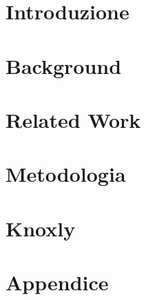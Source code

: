\documentclass[14pt]{extreport}
\begin{document}




\chapter{Introduzione}
\setcounter{page}{1} 		


\chapter{Background}


\chapter{Related Work}


\chapter{Metodologia}


\chapter{Knoxly}


\chapter*{Appendice}
\setlength{\headheight}{17pt}
\rhead{}
\fancyhead[L]{\rightmark}
\cfoot{\thepage}



\listoffigures %
\listoftables %
\end{document}
